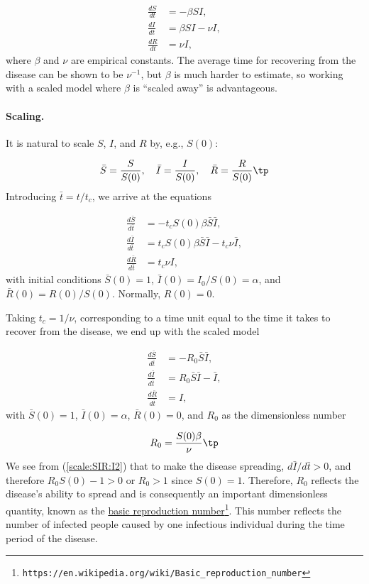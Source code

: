 \documentclass[graybox,envcountchap,sectrefs,final]{svmonodo}
\begin{document}
\begin{align}
\frac{dS}{dt} &= - \beta SI,
\label{scale:SIR:S}\\ 
\frac{dI}{dt} &= \beta SI - \nu I,
\label{scale:SIR:I}\\ 
\frac{dR}{dt} &= \nu I,
\label{scale:SIR:R}
\end{align}
where $\beta$ and $\nu$ are empirical constants. The average time for recovering
from the disease can be shown to be $\nu^{-1}$, but $\beta$ is much harder
to estimate, so working with a scaled model where $\beta$ is ``scaled away''
is advantageous.

\paragraph{Scaling.}
It is natural to scale $S$, $I$, and $R$ by, e.g., $S(0)$:

\[ \bar S = \frac{S}{S(0)},\quad \bar I = \frac{I}{S(0)},\quad
\bar R = \frac{R}{S(0)}\tp
\]
Introducing $\bar t = t/t_c$, we arrive at the equations

\begin{align*}
\frac{d\bar S}{d\bar t} &= - t_c S(0) \beta\bar S\bar I,
\\ 
\frac{d\bar I}{d\bar t} &= t_c S(0) \beta \bar S\bar I - t_c \nu \bar I,
\\ 
\frac{d\bar R}{d\bar t} &= t_c \nu I,
\end{align*}
with initial conditions $\bar S(0)=1$, $\bar I(0)=I_0/S(0)=\alpha$, and
$\bar R(0)=R(0)/S(0)$. Normally, $R(0)=0$.

Taking $t_c=1/\nu$, corresponding to a time unit equal to the time it takes
to recover from the disease, we end up with the scaled model

\begin{align}
\frac{d\bar S}{d\bar t} &= - R_0\bar S\bar I,
\label{scale:SIR:S2}\\ 
\frac{d\bar I}{d\bar t} &= R_0 \bar S\bar I - \bar I,
\label{scale:SIR:I2}\\ 
\frac{d\bar R}{d\bar t} &= I,
\label{scale:SIR:R2}
\end{align}
with $\bar S(0)=1$, $\bar I(0)=\alpha$, $\bar R(0)=0$, and $R_0$ as
the dimensionless number

\begin{equation}
R_0 = \frac{S(0)\beta}{\nu}\tp
\end{equation}
We see from (\ref{scale:SIR:I2}) that to make the disease spreading,
$d\bar I/d\bar t >0$, and therefore $R_0 S(0) - 1 > 0$ or $R_0 > 1$
since $S(0)=1$.
Therefore, $R_0$ reflects the disease's ability to spread and is
consequently an important dimensionless quantity, known as the \href{{https://en.wikipedia.org/wiki/Basic_reproduction_number}}{basic
reproduction number}\footnote{\texttt{https://en.wikipedia.org/wiki/Basic\_reproduction\_number}}.
This number reflects the number of infected people caused by one infectious
individual during the time period of the disease.
\end{document}
